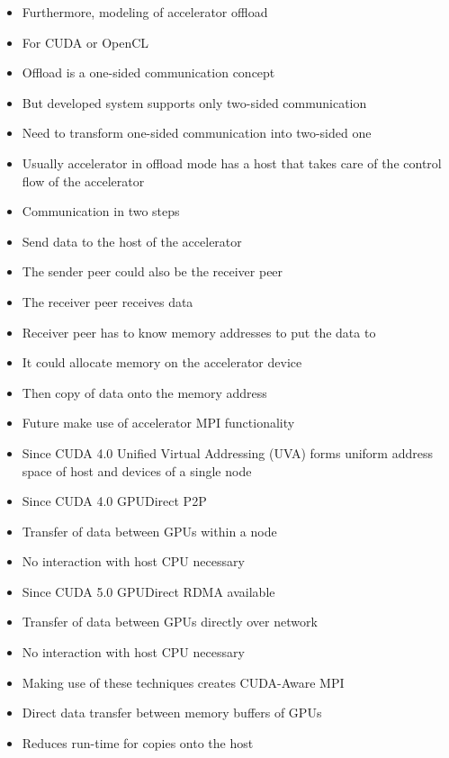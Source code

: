 \begin{itemize}
\item Furthermore, modeling of accelerator offload
\item For CUDA or OpenCL 
\item Offload is a one-sided communication concept
\item But developed system supports only two-sided communication
\item Need to transform one-sided communication into two-sided one
\item Usually accelerator in offload mode has a host that
  takes care of the control flow of the accelerator
\item Communication in two steps
\item Send data to the host of the accelerator
\item The sender peer  could also be the receiver peer
\item The receiver peer receives data
\item Receiver peer has to know memory addresses to put
  the data to
\item It could allocate memory on the accelerator device
\item Then copy of data onto the memory address

\item Future make use of accelerator MPI functionality
\item Since CUDA 4.0 Unified Virtual Addressing (UVA) forms
  uniform address space of host and devices of a single node

\item Since CUDA 4.0 GPUDirect P2P
\item Transfer of data between GPUs within a node
\item No interaction with host CPU necessary

\item Since CUDA 5.0 GPUDirect RDMA available
\item Transfer of data between GPUs directly over network
\item No interaction with host CPU necessary

\item Making use of these techniques creates CUDA-Aware MPI
\item Direct data transfer between memory buffers of GPUs
\item Reduces run-time for copies onto the host


\end{itemize}


